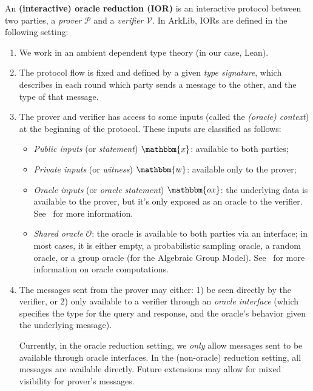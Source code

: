 An \textbf{(interactive) oracle reduction (IOR)} is an interactive protocol between two parties, a
\emph{prover} $\mathcal{P}$ and a \emph{verifier} $\mathcal{V}$. In ArkLib, IORs are defined in the
following setting:
\begin{enumerate}
    \item We work in an ambient dependent type theory (in our case, Lean).

    \item The protocol flow is fixed and defined by a given \emph{type signature}, which
    describes in each round which party sends a message to the other, and the type of that message.

    \item The prover and verifier has access to some inputs (called the \emph{(oracle) context}) at
    the beginning of the protocol. These inputs are classified as follows:
    \begin{itemize}
        \item \emph{Public inputs} (or \emph{statement}) $\mathbbm{x}$: available to both parties;
        \item \emph{Private inputs} (or \emph{witness}) $\mathbbm{w}$: available only to the prover;
        \item \emph{Oracle inputs} (or \emph{oracle statement}) $\mathbbm{ox}$: the underlying data
        is available to the prover, but it's only exposed as an oracle to the verifier. See~ for more information.
        \item \emph{Shared oracle} $\mathcal{O}$: the oracle is available to both parties via an
        interface; in most cases, it is either empty, a probabilistic sampling oracle, a random
        oracle, or a group oracle (for the Algebraic Group Model). See~ for more
        information on oracle computations.
    \end{itemize}

    \item The messages sent from the prover may either: 1) be seen directly by the verifier, or 2)
    only available to a verifier through an \emph{oracle interface} (which specifies the type for
    the query and response, and the oracle's behavior given the underlying message).

    Currently, in the oracle reduction setting, we \emph{only} allow messages sent to be available
    through oracle interfaces. In the (non-oracle) reduction setting, all messages are available
    directly. Future extensions may allow for mixed visibility for prover's messages.


\end{enumerate}
